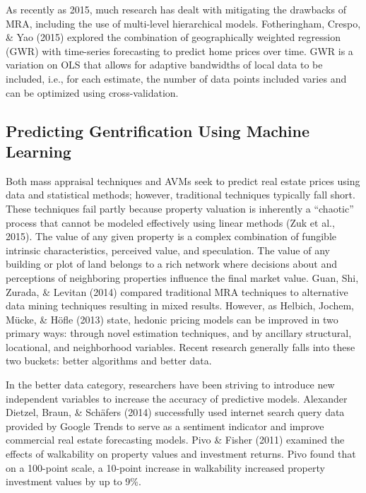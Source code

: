 \documentclass[12pt,]{article}
\begin{document}
As recently as 2015, much research has dealt with mitigating the
drawbacks of MRA, including the use of multi-level hierarchical models.
Fotheringham, Crespo, \& Yao (2015) explored the combination of
geographically weighted regression (GWR) with time-series forecasting to
predict home prices over time. GWR is a variation on OLS that allows for
adaptive bandwidths of local data to be included, i.e., for each
estimate, the number of data points included varies and can be optimized
using cross-validation.

\hypertarget{predicting-gentrification-using-machine-learning}{%
\subsection{Predicting Gentrification Using Machine
Learning}\label{predicting-gentrification-using-machine-learning}}

Both mass appraisal techniques and AVMs seek to predict real estate
prices using data and statistical methods; however, traditional
techniques typically fall short. These techniques fail partly because
property valuation is inherently a ``chaotic'' process that cannot be
modeled effectively using linear methods (Zuk et al., 2015). The value
of any given property is a complex combination of fungible intrinsic
characteristics, perceived value, and speculation. The value of any
building or plot of land belongs to a rich network where decisions about
and perceptions of neighboring properties influence the final market
value. Guan, Shi, Zurada, \& Levitan (2014) compared traditional MRA
techniques to alternative data mining techniques resulting in mixed
results. However, as Helbich, Jochem, Mücke, \& Höfle (2013) state,
hedonic pricing models can be improved in two primary ways: through
novel estimation techniques, and by ancillary structural, locational,
and neighborhood variables. Recent research generally falls into these
two buckets: better algorithms and better data.

In the better data category, researchers have been striving to introduce
new independent variables to increase the accuracy of predictive models.
Alexander Dietzel, Braun, \& Schäfers (2014) successfully used internet
search query data provided by Google Trends to serve as a sentiment
indicator and improve commercial real estate forecasting models. Pivo \&
Fisher (2011) examined the effects of walkability on property values and
investment returns. Pivo found that on a 100-point scale, a 10-point
increase in walkability increased property investment values by up to
9\%.
\end{document}
